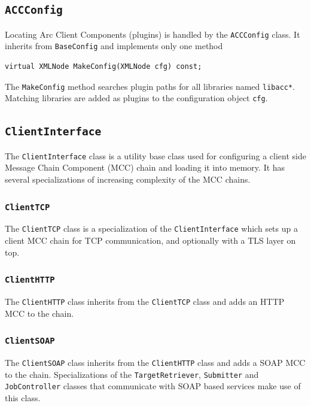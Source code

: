 \documentclass{book}
\newcommand{\ACCConfig}{\texttt{ACCConfig}}
\newcommand{\ClientInterface}{\texttt{ClientInterface}}
\newcommand{\ClientTCP}{\texttt{ClientTCP}}
\newcommand{\ClientHTTP}{\texttt{ClientHTTP}}
\newcommand{\ClientSOAP}{\texttt{ClientSOAP}}
\newcommand{\JobController}{\texttt{JobController}}
\newcommand{\TargetRetriever}{\texttt{TargetRetriever}}
\newcommand{\Submitter}{\texttt{Submitter}}
\begin{document}
\subsection{{\ACCConfig}}

Locating Arc Client Components (plugins) is handled by the
{\ACCConfig} class. It inherits from \texttt{BaseConfig} and
implements only one method

\begin{shaded}
\begin{verbatim}
virtual XMLNode MakeConfig(XMLNode cfg) const;
\end{verbatim}
\end{shaded}

The \texttt{MakeConfig} method searches plugin paths for all libraries
named \texttt{libacc*}. Matching libraries are added as plugins to the
configuration object \texttt{cfg}.

\subsection{{\ClientInterface}}

The {\ClientInterface} class is a utility base class used for
configuring a client side Message Chain Component (MCC) chain and
loading it into memory. It has several specializations of increasing
complexity of the MCC chains.

\subsubsection{{\ClientTCP}}

The {\ClientTCP} class is a specialization of the {\ClientInterface}
which sets up a client MCC chain for TCP communication, and optionally
with a TLS layer on top.

\subsubsection{{\ClientHTTP}}

The {\ClientHTTP} class inherits from the {\ClientTCP} class and adds
an HTTP MCC to the chain.

\subsubsection{{\ClientSOAP}}

The {\ClientSOAP} class inherits from the {\ClientHTTP} class and adds
a SOAP MCC to the chain. Specializations of the {\TargetRetriever},
{\Submitter} and {\JobController} classes that communicate with SOAP
based services make use of this class.
\end{document}
